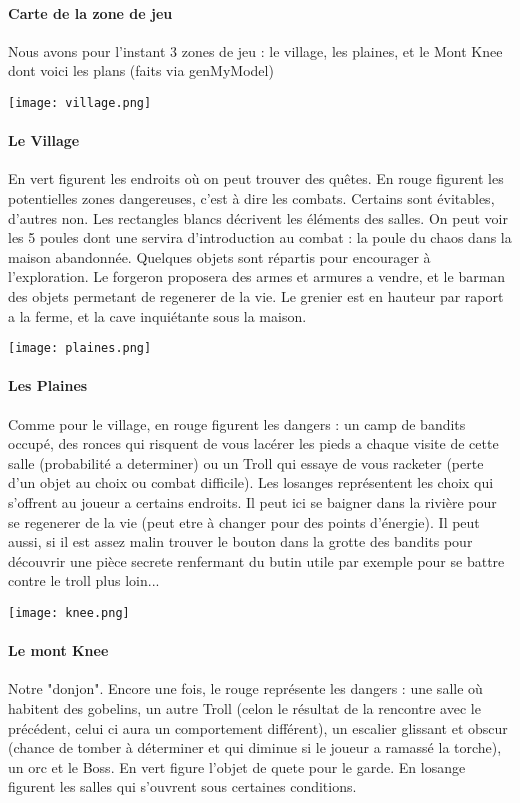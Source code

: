 \documentclass[11pt,a4paper]{report}
\begin{document}
\paragraph{Carte de la zone de jeu}
Nous avons pour l'instant 3 zones de jeu : le village, les plaines, et le Mont Knee dont voici les plans (faits via genMyModel)
\centerline{\texttt{[image: village.png]}}
\paragraph{Le Village}
En vert figurent les endroits où on peut trouver des quêtes. En rouge figurent les potentielles zones dangereuses, c'est à dire les combats. Certains sont évitables, d'autres non. Les rectangles blancs décrivent les éléments des salles. On peut voir les 5 poules dont une servira d'introduction au combat : la poule du chaos dans la maison abandonnée. Quelques objets sont répartis pour encourager à l'exploration. Le forgeron proposera des armes et armures a vendre, et le barman des objets permetant de regenerer de la vie. Le grenier est en hauteur par raport a la ferme, et la cave inquiétante sous la maison.
\centerline{\texttt{[image: plaines.png]}}
\paragraph{Les Plaines}
Comme pour le village, en rouge figurent les dangers : un camp de bandits occupé, des ronces qui risquent de vous lacérer les pieds a chaque visite de cette salle (probabilité a determiner) ou un Troll qui essaye de vous racketer (perte d'un objet au choix ou combat difficile). Les losanges représentent les choix qui s'offrent au joueur a certains endroits. Il peut ici se baigner dans la rivière pour se regenerer de la vie (peut etre à changer pour des points d'énergie). Il peut aussi, si il est assez malin trouver le bouton dans la grotte des bandits pour découvrir une pièce secrete renfermant du butin utile par exemple pour se battre contre le troll plus loin...
\centerline{\texttt{[image: knee.png]}}
\paragraph{Le mont Knee}
Notre "donjon". Encore une fois, le rouge représente les dangers : une salle où habitent des gobelins, un autre Troll (celon le résultat de la rencontre avec le précédent, celui ci aura un comportement différent), un escalier glissant et obscur (chance de tomber à déterminer et qui diminue si le joueur a ramassé la torche), un orc et le Boss. En vert figure l'objet de quete pour le garde. En losange figurent les salles qui s'ouvrent sous certaines conditions.
\end{document}
